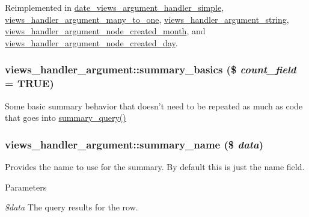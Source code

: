 Reimplemented in \hyperlink{classdate__views__argument__handler__simple_abf0949dba7eba44e72cb5f935285716e}{date\_\-views\_\-argument\_\-handler\_\-simple}, \hyperlink{classviews__handler__argument__many__to__one_a94fb0499ff1078d0423de06d33e898a5}{views\_\-handler\_\-argument\_\-many\_\-to\_\-one}, \hyperlink{classviews__handler__argument__string_a185c0d31b97f98df85073d53b3f8c26d}{views\_\-handler\_\-argument\_\-string}, \hyperlink{classviews__handler__argument__node__created__month_a4ecc9b35ee8ae4e8d61d18e83f1dfe82}{views\_\-handler\_\-argument\_\-node\_\-created\_\-month}, and \hyperlink{classviews__handler__argument__node__created__day_ac7f626914f87a04112962bf39d49d454}{views\_\-handler\_\-argument\_\-node\_\-created\_\-day}.\hypertarget{classviews__handler__argument_aa5fe1eefd53a7ee6438b34c8cdbb1aec}{
\subsubsection[{summary\_\-basics}]{\setlength{\rightskip}{0pt plus 5cm}views\_\-handler\_\-argument::summary\_\-basics (\$ {\em count\_\-field} = {\ttfamily TRUE})}}
\label{classviews__handler__argument_aa5fe1eefd53a7ee6438b34c8cdbb1aec}
Some basic summary behavior that doesn't need to be repeated as much as code that goes into \hyperlink{classviews__handler__argument_a1dd6cc301b1c7c1c6829c59eb641a883}{summary\_\-query()} \hypertarget{classviews__handler__argument_a4c55a340453eed4d35c69f7ac790cac1}{
\subsubsection[{summary\_\-name}]{\setlength{\rightskip}{0pt plus 5cm}views\_\-handler\_\-argument::summary\_\-name (\$ {\em data})}}
\label{classviews__handler__argument_a4c55a340453eed4d35c69f7ac790cac1}
Provides the name to use for the summary. By default this is just the name field.


\begin{DoxyParams}{Parameters}
\item[{\em \$data}]The query results for the row. \end{DoxyParams}


